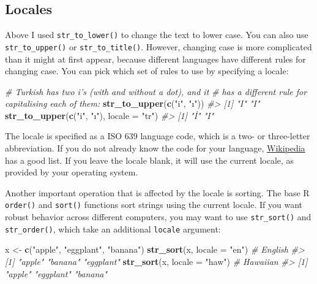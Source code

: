 \documentclass[]{book}
\newenvironment{Shaded}{\begin{snugshade}}{\end{snugshade}}
\newcommand{\KeywordTok}[1]{\textcolor[rgb]{0.13,0.29,0.53}{\textbf{#1}}}
\newcommand{\DataTypeTok}[1]{\textcolor[rgb]{0.13,0.29,0.53}{#1}}
\newcommand{\StringTok}[1]{\textcolor[rgb]{0.31,0.60,0.02}{#1}}
\newcommand{\CommentTok}[1]{\textcolor[rgb]{0.56,0.35,0.01}{\textit{#1}}}
\newcommand{\NormalTok}[1]{#1}
\begin{document}
\subsection{Locales}\label{locales}

Above I used \texttt{str\_to\_lower()} to change the text to lower case.
You can also use \texttt{str\_to\_upper()} or \texttt{str\_to\_title()}.
However, changing case is more complicated than it might at first
appear, because different languages have different rules for changing
case. You can pick which set of rules to use by specifying a locale:

\begin{Shaded}
\begin{Highlighting}[]
\CommentTok{# Turkish has two i's (with and without a dot), and it}
\CommentTok{# has a different rule for capitalising each of them:}
\KeywordTok{str_to_upper}\NormalTok{(}\KeywordTok{c}\NormalTok{(}\StringTok{"i"}\NormalTok{, }\StringTok{"ı"}\NormalTok{))}
\CommentTok{#> [1] "I" "I"}
\KeywordTok{str_to_upper}\NormalTok{(}\KeywordTok{c}\NormalTok{(}\StringTok{"i"}\NormalTok{, }\StringTok{"ı"}\NormalTok{), }\DataTypeTok{locale =} \StringTok{"tr"}\NormalTok{)}
\CommentTok{#> [1] "İ" "I"}
\end{Highlighting}
\end{Shaded}

The locale is specified as a ISO 639 language code, which is a two- or
three-letter abbreviation. If you do not already know the code for your
language,
\href{https://en.wikipedia.org/wiki/List_of_ISO_639-1_codes}{Wikipedia}
has a good list. If you leave the locale blank, it will use the current
locale, as provided by your operating system.

Another important operation that is affected by the locale is sorting.
The base R \texttt{order()} and \texttt{sort()} functions sort strings
using the current locale. If you want robust behavior across different
computers, you may want to use \texttt{str\_sort()} and
\texttt{str\_order()}, which take an additional \texttt{locale}
argument:

\begin{Shaded}
\begin{Highlighting}[]
\NormalTok{x <-}\StringTok{ }\KeywordTok{c}\NormalTok{(}\StringTok{"apple"}\NormalTok{, }\StringTok{"eggplant"}\NormalTok{, }\StringTok{"banana"}\NormalTok{)}
\KeywordTok{str_sort}\NormalTok{(x, }\DataTypeTok{locale =} \StringTok{"en"}\NormalTok{)  }\CommentTok{# English}
\CommentTok{#> [1] "apple"    "banana"   "eggplant"}
\KeywordTok{str_sort}\NormalTok{(x, }\DataTypeTok{locale =} \StringTok{"haw"}\NormalTok{) }\CommentTok{# Hawaiian}
\CommentTok{#> [1] "apple"    "eggplant" "banana"}
\end{Highlighting}
\end{Shaded}
\end{document}
